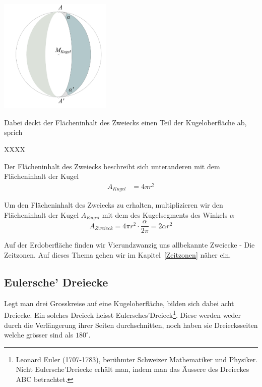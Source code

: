 \begin{refsection}
\begin{refsection}
\begin{center}
        \includegraphics[width=0.4\textwidth]{kugel/_Zweieck.jpg}
\end{center}

Dabei deckt der Flächeninhalt des Zweiecks einen Teil der Kugeloberfläche ab, sprich

XXXX

Der Flächeninhalt des Zweiecks beschreibt sich unteranderen mit dem Flächeninhalt der Kugel
\begin{align*}
A_{ Kugel } &= 4 \pi r^{2}
\end{align*}

Um den Flächeninhalt des Zweiecks zu erhalten, multiplizieren wir den Flächeninhalt der Kugel $A_{ Kugel }$ mit dem des Kugelsegments des Winkels $\alpha$ 
\begin{equation}
A_{ Zweieck } = 4 \pi r^{2} \cdot \frac{ \alpha }{ 2 \pi } = 2 \alpha r^{2}
\end{equation}

Auf der Erdoberfläche finden wir Vierundzwanzig uns allbekannte Zweiecke - Die Zeitzonen. Auf dieses Thema gehen wir im Kapitel~\ref{Zeitzonen}  näher ein.


\subsection{Eulersche’ Dreiecke} \label{Euler} 
Legt man drei Grosskreise auf eine Kugeloberfläche, bilden sich dabei acht Dreiecke. 
Ein solches Dreieck heisst Eulersches’Dreieck\footnote{%
Leonard Euler (1707-1783), berühmter Schweizer Mathematiker und Physiker. 
Nicht Eulersche’Dreiecke erhält man, indem man das Äussere des Dreieckes ABC betrachtet.}.
Diese werden weder durch die Verlängerung ihrer Seiten durchschnitten, 
noch haben sie Dreiecksseiten welche grösser sind als $180^{\circ}$.


\end{refsection}
\end{refsection}
